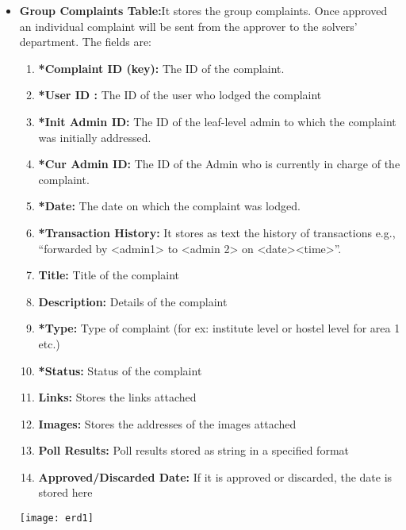 \documentclass{article}
\begin{document}
\begin{itemize}
 
 \item \textbf{Group Complaints Table:}It stores the group complaints. Once approved an individual complaint will be sent from the approver to the solvers’ department. The fields are:


\begin{enumerate}
\item \textbf{*Complaint ID (key):} The ID of the complaint.
\item \textbf{*User ID :} The ID of the user who lodged the complaint
\item \textbf{*Init Admin ID:} The ID of the leaf-level admin to which the complaint was initially addressed.
\item \textbf{*Cur Admin ID:} The ID of the Admin who is currently in charge of the complaint.
\item \textbf{*Date:} The date on which the complaint was lodged.
\item \textbf{*Transaction History:} It stores as text the history of transactions e.g., “forwarded by <admin1> to <admin 2> on <date><time>”.
\item \textbf{Title:} Title of the complaint
\item \textbf{Description:} Details of the complaint
\item \textbf{*Type:} Type of complaint (for ex: institute level or hostel level for area 1 etc.)
\item \textbf{*Status:} Status of the complaint
\item \textbf{Links:} Stores the links attached
\item \textbf{Images:} Stores the addresses of the images attached
\item \textbf{Poll Results:} Poll results stored as string in a specified format
\item \textbf{Approved/Discarded Date:} If it is approved or discarded, the date is stored here
 \end{enumerate}

\newline
\begin{minipage}{\linewidth}
	        
	        \texttt{[image: erd1]}
            \end{minipage}
 

\end{itemize}
\end{document}
